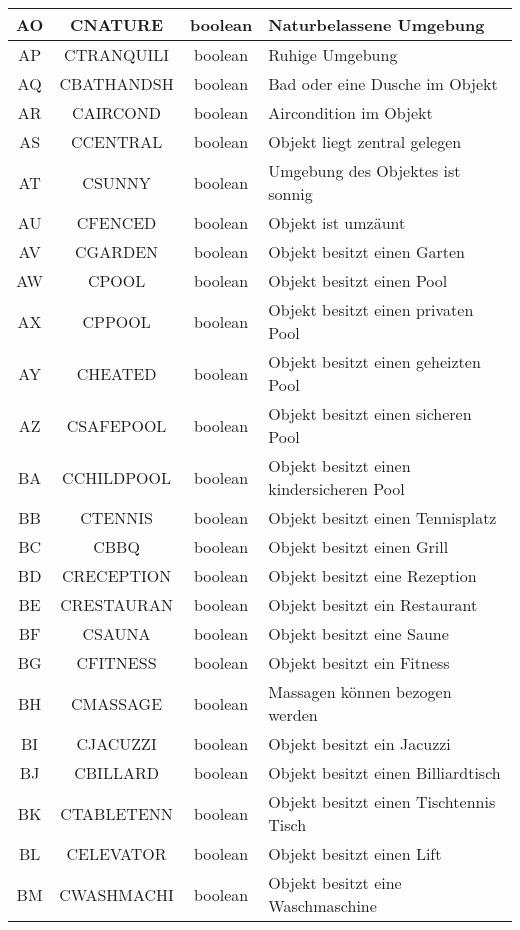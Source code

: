 \begin{longtable}{ | c | c | c | L{7.5cm} | }
	AO & CNATURE & boolean & Naturbelassene Umgebung \\ \hline 
	AP & CTRANQUILI & boolean & Ruhige Umgebung \\ \hline 
	AQ & CBATHANDSH & boolean & Bad oder eine Dusche im Objekt \\ \hline 
	AR & CAIRCOND & boolean & Aircondition im Objekt\\ \hline 
	AS & CCENTRAL & boolean & Objekt liegt zentral gelegen \\ \hline 
	AT & CSUNNY & boolean & Umgebung des Objektes ist sonnig \\ \hline 
	AU & CFENCED & boolean & Objekt ist umzäunt \\ \hline 
	AV & CGARDEN & boolean & Objekt besitzt einen Garten \\ \hline 
	AW & CPOOL & boolean & Objekt besitzt einen Pool \\ \hline 
	AX & CPPOOL & boolean & Objekt besitzt einen privaten Pool \\ \hline 
	AY & CHEATED & boolean & Objekt besitzt einen geheizten Pool \\ \hline 
	AZ & CSAFEPOOL & boolean & Objekt besitzt einen sicheren Pool \\ \hline 
	BA & CCHILDPOOL & boolean & Objekt besitzt einen kindersicheren Pool \\ \hline 
	BB & CTENNIS & boolean & Objekt besitzt einen Tennisplatz \\ \hline 
	BC & CBBQ & boolean & Objekt besitzt einen Grill \\ \hline 
	BD & CRECEPTION & boolean & Objekt besitzt eine Rezeption \\ \hline 
	BE & CRESTAURAN & boolean & Objekt besitzt ein Restaurant \\ \hline 
	BF & CSAUNA & boolean & Objekt besitzt eine Saune \\ \hline 
	BG & CFITNESS & boolean & Objekt besitzt ein Fitness \\ \hline 
	BH & CMASSAGE & boolean & Massagen können bezogen werden \\ \hline 
	BI & CJACUZZI & boolean & Objekt besitzt ein Jacuzzi \\ \hline 
	BJ & CBILLARD & boolean & Objekt besitzt einen Billiardtisch \\ \hline 
	BK & CTABLETENN & boolean & Objekt besitzt einen Tischtennis Tisch \\ \hline 
	BL & CELEVATOR & boolean & Objekt besitzt einen Lift \\ \hline 
	BM & CWASHMACHI & boolean & Objekt besitzt eine Waschmaschine \\ \hline 

\end{longtable}
